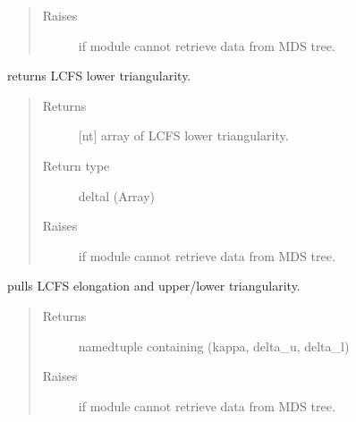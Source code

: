 \documentclass[letterpaper,10pt,english]{sphinxmanual}
\begin{document}
\begin{fulllineitems}
\begin{fulllineitems}
\begin{quote}
\begin{description}
\item[{Raises}] \leavevmode
{} \textendash{} if module cannot retrieve data from MDS tree.

\end{description}\end{quote}

\end{fulllineitems}


\begin{fulllineitems}
\label{\detokenize{eqtools:eqtools.EFIT.EFITTree.getLowerTriangularity}}
returns LCFS lower triangularity.
\begin{quote}\begin{description}
\item[{Returns}] \leavevmode
{[}nt{]} array of LCFS lower triangularity.

\item[{Return type}] \leavevmode
deltal (Array)

\item[{Raises}] \leavevmode
{} \textendash{} if module cannot retrieve data from MDS tree.

\end{description}\end{quote}

\end{fulllineitems}


\begin{fulllineitems}
\label{\detokenize{eqtools:eqtools.EFIT.EFITTree.getShaping}}
pulls LCFS elongation and upper/lower triangularity.
\begin{quote}\begin{description}
\item[{Returns}] \leavevmode
namedtuple containing (kappa, delta\_u, delta\_l)

\item[{Raises}] \leavevmode
{} \textendash{} if module cannot retrieve data from MDS tree.


\end{description}
\end{quote}
\end{fulllineitems}
\end{fulllineitems}
\end{document}
